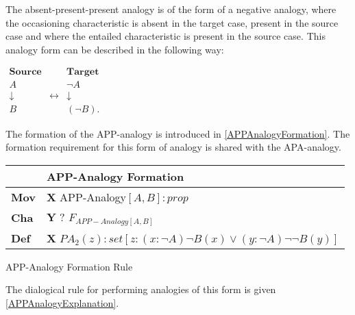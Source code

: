 				The absent-present-present analogy is of the form of a negative analogy, where the occasioning characteristic is absent in  the target case, present in the source case and where the entailed characteristic is present in the source case. This analogy form can be described in the following way:
                	\begin{table}[H]
                	\centering	
                	$
                    \begin{array}{ccc}
                    	\textbf{Source} &                 & \textbf{Target} \\
                    	A               &  & \neg A          \\
                    	\downarrow      & \leftrightarrow & \downarrow      \\
                    	B               &  & (\neg B).
                    \end{array}
               	 	$
               	 	\end{table}
%
               	 	The formation of the APP-analogy is introduced in \autoref{APPAnalogyFormation}. The formation requirement for this form of analogy is shared with the APA-analogy. 
               	 	
               		\begin{Scheme}[H]\footnotesize
               		\centering
               		\begin{tabular}{l l}
               			                   & \textbf{APP-Analogy Formation} \\ \toprule
               			\textbf{Mov}      & \textbf{X} APP-Analogy$[A,B] : prop$ \\ \midrule
               			\textbf{Cha} & \textbf{Y} ? $F_{APP-Analogy[A,B]}$ \\ \midrule
               			\textbf{Def}   & \textbf{X} $PA_2(z) : set [z : (x : \neg A) \neg B(x) \lor (y : \neg A) \neg \neg B(y)]$ \\ \bottomrule
               		\end{tabular}
               		\caption{APP-Analogy Formation Rule}
               		\label{APPAnalogyFormation}
					\end{Scheme} 
               	 	
               	 \noindent The dialogical rule for performing analogies of this form is given \autoref{APPAnalogyExplanation}.
					
